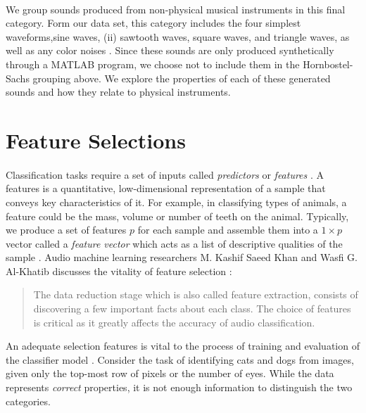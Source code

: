 \documentclass[12pt,letterpaper]{article}
\begin{document}
\paragraph*{}We group sounds produced from non-physical musical instruments in this final category. Form our data set, this category includes the four simplest waveforms,sine waves, (ii) sawtooth waves, square waves, and triangle waves, as well as any color noises \cite{White}. Since these sounds are only produced synthetically through a MATLAB program, we choose not to include them in the Hornbostel-Sachs grouping above. We explore the properties of each of these generated sounds and how they relate to physical instruments.






\newpage
\section{Feature Selections}
\label{sec-Features}

\paragraph*{}Classification tasks require a set of inputs called \textit{predictors} or \textit{features} \cite{James,Loy,Serizel}. A features is a quantitative, low-dimensional representation of a sample that conveys key characteristics of it. For example, in classifying types of animals, a feature could be the mass, volume or number of teeth on the animal. Typically, we produce a set of features $p$ for each sample and assemble them into a $1 \times p$ vector called a \textit{feature vector} which acts as a list of descriptive qualities of the sample \cite{Geron,James}.
Audio machine learning researchers M. Kashif Saeed Khan and Wasfi G. Al-Khatib discusses the vitality of feature selection \cite{Khan}:
\begin{quote}
The data reduction stage which is also called feature extraction, consists of discovering a few important facts about each class. The choice of features is critical as it greatly affects the accuracy of audio classification. 
\end{quote}
An adequate selection features is vital to the process of training and evaluation of the classifier model \cite{Mierswa,Serizel,Liu}. Consider the task of identifying cats and dogs from images, given only the top-most row of pixels or the number of eyes. While the data represents \textit{correct} properties, it is not enough information to distinguish the two categories.
\end{document}
